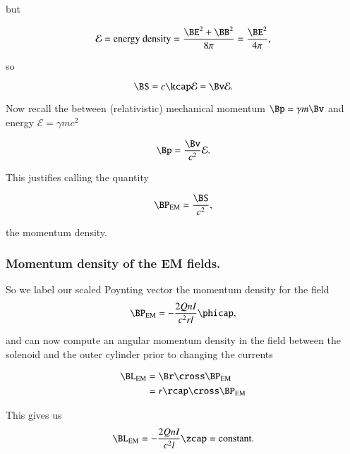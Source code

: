 but

\begin{equation}\label{eqn:relativisticElectrodynamicsT5:190}
\mathcal{E} = \text{energy density} = \frac{\BE^2 + \BB^2}{8 \pi} = \frac{\BE^2}{4 \pi},
\end{equation}

so

\begin{equation}\label{eqn:relativisticElectrodynamicsT5:210}
\BS = c \kcap \mathcal{E} = \Bv \mathcal{E}.
\end{equation}

Now recall the between (relativistic) mechanical momentum $\Bp = \gamma m \Bv$ and energy $\mathcal{E} = \gamma m c^2$

\begin{equation}\label{eqn:relativisticElectrodynamicsT5:230}
\Bp = \frac{\Bv}{c^2} \mathcal{E}.
\end{equation}

This justifies calling the quantity

\begin{equation}\label{eqn:relativisticElectrodynamicsT5:250}
\BP_{\text{EM}} = \frac{\BS}{c^2},
\end{equation}

the momentum density.

\subsubsection{Momentum density of the EM fields.}

So we label our scaled Poynting vector the momentum density for the field
\begin{equation}\label{eqn:relativisticElectrodynamicsT5:270}
\BP_{\text{EM}} = -\frac{2 Q n I}{c^2 r l} \phicap,
\end{equation}

and can now compute an angular momentum density in the field between the solenoid and the outer cylinder prior to changing the currents

\begin{align*}
\BL_{\text{EM}}
&= \Br \cross \BP_{\text{EM}} \\
&= r \rcap \cross \BP_{\text{EM}} \\
\end{align*}

This gives us
\begin{equation}\label{eqn:relativisticElectrodynamicsT5:271}
\BL_{\text{EM}} = -\frac{2 Q n I}{c^2 l} \zcap = \text{constant}.
\end{equation}

